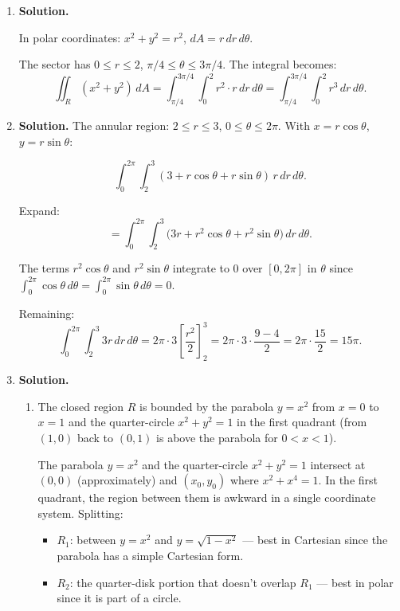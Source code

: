 \begin{enumerate}
\item \textbf{Solution.}
\begin{center}
\end{center}
In polar coordinates: $x^2+y^2 = r^2$, $dA = r\,dr\,d\theta$.

The sector has $0\le r\le 2$, $\pi/4\le\theta\le 3\pi/4$. The integral becomes:
\[
\boxed{\iint_R(x^2+y^2)\,dA = \int_{\pi/4}^{3\pi/4}\int_0^2 r^2\cdot r\,dr\,d\theta = \int_{\pi/4}^{3\pi/4}\int_0^2 r^3\,dr\,d\theta}.
\]

\item \textbf{Solution.}
The annular region: $2\le r\le 3$, $0\le\theta\le 2\pi$. With $x = r\cos\theta$, $y = r\sin\theta$:

\[
\int_0^{2\pi}\!\int_2^3 (3+r\cos\theta+r\sin\theta)\,r\,dr\,d\theta.
\]

Expand:
\[
= \int_0^{2\pi}\!\int_2^3\bigl(3r + r^2\cos\theta + r^2\sin\theta\bigr)\,dr\,d\theta.
\]

The terms $r^2\cos\theta$ and $r^2\sin\theta$ integrate to 0 over $[0,2\pi]$ in $\theta$ since $\int_0^{2\pi}\cos\theta\,d\theta = \int_0^{2\pi}\sin\theta\,d\theta = 0$.

Remaining:
\[
\int_0^{2\pi}\int_2^3 3r\,dr\,d\theta = 2\pi\cdot 3\left[\frac{r^2}{2}\right]_2^3 = 2\pi\cdot 3\cdot\frac{9-4}{2} = 2\pi\cdot\frac{15}{2} = \boxed{15\pi}.
\]

\item \textbf{Solution.}
\begin{enumerate}
\item The closed region $R$ is bounded by the parabola $y=x^2$ from $x=0$ to $x=1$ and the quarter-circle $x^2+y^2=1$ in the first quadrant (from $(1,0)$ back to $(0,1)$ is above the parabola for $0<x<1$).

The parabola $y=x^2$ and the quarter-circle $x^2+y^2=1$ intersect at $(0,0)$ (approximately) and $(x_0,y_0)$ where $x^2+x^4=1$. In the first quadrant, the region between them is awkward in a single coordinate system. Splitting:
\begin{itemize}
\item $R_1$: between $y=x^2$ and $y=\sqrt{1-x^2}$ --- best in Cartesian since the parabola has a simple Cartesian form.
\item $R_2$: the quarter-disk portion that doesn't overlap $R_1$ --- best in polar since it is part of a circle.
\end{itemize}


\end{enumerate}
\end{enumerate}
